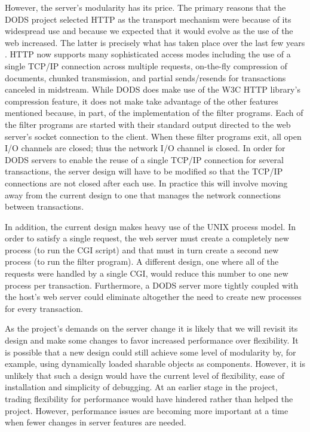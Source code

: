 \documentclass[12pt]{article}
\begin{document}
However, the server's modularity has its price. The primary reasons that the
DODS project selected HTTP as the transport mechanism were because of its
widespread use and because we expected that it would evolve as the use of the
web increased. The latter is precisely what has taken place over the last few
years \cite{nielsen:http}. \acs{HTTP} now supports many sophisticated access
modes including the use of a single \acs{TCP/IP} connection across multiple
requests, on-the-fly compression of documents, chunked transmission, and
partial sends/resends for transactions canceled in midstream. While \ac{DODS}
does make use of the \acs{W3C} \acs{HTTP} library's compression feature, it
does not make take advantage of the other features mentioned because, in
part, of the implementation of the filter programs.  Each of the filter
programs are started with their standard output directed to the web server's
socket connection to the client. When these filter programs exit, all open
I/O channels are closed; thus the network I/O channel is closed. In order for
\ac{DODS} servers to enable the reuse of a single \acs{TCP/IP} connection for
several transactions, the server design will have to be modified so that the
\acs{TCP/IP} connections are not closed after each use. In practice this will
involve moving away from the current design to one that manages the network
connections between transactions.

In addition, the current design makes heavy use of the UNIX process model. In
order to satisfy a single request, the web server must create a completely
new process (to run the \ac{CGI} script) and that must in turn create a
second new process (to run the filter program). A different design, one where
all of the requests were handled by a single \ac{CGI}, would reduce this
number to one new process per transaction. Furthermore, a \ac{DODS} server
more tightly coupled with the host's web server could eliminate altogether
the need to create new processes for every transaction.

As the project's demands on the server change it is likely that we will
revisit its design and make some changes to favor increased performance over
flexibility. It is possible that a new design could still achieve some level
of modularity by, for example, using dynamically loaded sharable objects as
components. However, it is unlikely that such a design would have the current
level of flexibility, ease of installation and simplicity of debugging. At an
earlier stage in the project, trading flexibility for performance would have
hindered rather than helped the project. However, performance issues are
becoming more important at a time when fewer changes in server features are
needed.
\end{document}
